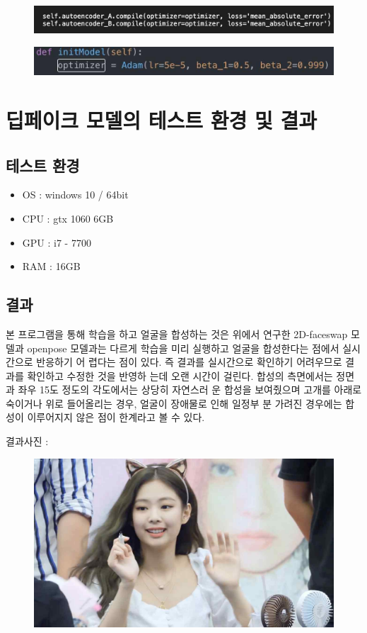 \documentclass[chapter,oneside]{oblivoir}
\newcommand{\spec}{
    \begin{itemize}
        \item OS : windows 10 / 64bit
        \item CPU : gtx 1060 6GB
        \item GPU : i7 - 7700
        \item RAM : 16GB
    \end{itemize}
    }
\begin{document}
\begin{figure}[h!]
\centering
\includegraphics{pic/chp4/img831}
\end{figure}

\begin{figure}[h!]
\centering
\includegraphics[scale = 0.7]{pic/chp4/img838}
\end{figure}

\section{ 딥페이크 모델의 테스트 환경 및 결과}

\subsection{테스트 환경 }
\spec
\subsection{결과}

본 프로그램을 통해 학습을 하고 얼굴을 합성하는 것은 위에서 연구한 2D-faceswap 모델과  openpose 모델과는 다르게 학습을 미리 실행하고 얼굴을 합성한다는 점에서 실시간으로 반응하기 어 렵다는 점이 있다. 즉 결과를 실시간으로 확인하기 어려우므로 결과를 확인하고 수정한 것을 반영하 는데 오랜 시간이 걸린다. 합성의 측면에서는 정면과 좌우 15도 정도의 각도에서는 상당히 자연스러 운 합성을 보여줬으며 고개를 아래로 숙이거나 위로 들어올리는 경우, 얼굴이 장애물로 인해 일정부 분 가려진 경우에는 합성이 이루어지지 않은 점이 한계라고 볼 수 있다.

결과사진 :

\begin{figure}[h!]
\centering
\includegraphics[scale = 0.5]{pic/chp4/img845}
\end{figure}
\end{document}
